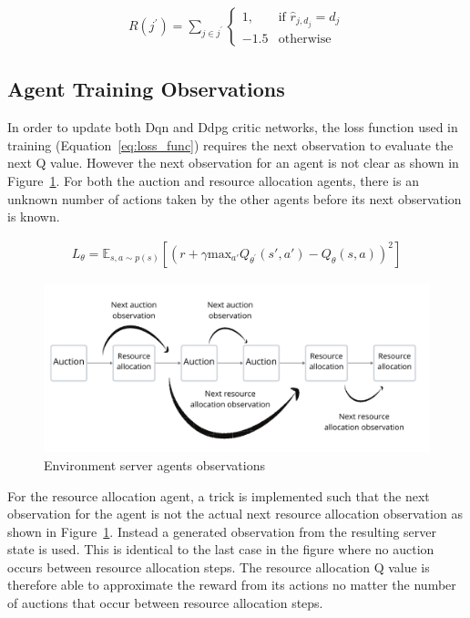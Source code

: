 \begin{align}
    R(j^{'}) = \sum_{j \in j^{'}}
        \begin{cases}
        1,  &\text{if } \hat{r}_{j, d_j} = d_j \\
       -1.5 &\text{otherwise }
        \end{cases}
\end{align}

\subsection{Agent Training Observations}
\label{subsec:agent-training-observations}
In order to update both Dqn and Ddpg critic networks, the loss function used in training (Equation~\eqref{eq:loss_func})
requires the next observation to evaluate the next Q value. However the next observation for an
agent is not clear as shown in Figure~\ref{fig:environment-observations}. For both the auction and resource allocation
agents, there is an unknown number of actions taken by the other agents before its next observation is known.

\begin{align}
    L_{\theta} = \mathbb{E}_{s, a \sim p(s)} \left[ (r + \gamma \text{max}_{a'} Q_{\theta^{'}}(s', a') - Q_{\theta}(s, a))^2 \right] \label{eq:loss_func}
\end{align}

\begin{figure}[h]
    \centering
    \includegraphics[width=14cm]{figures/4_implementation_figs/env_server_agents_observations.pdf}
    \caption{Environment server agents observations}
    \label{fig:environment-observations}
\end{figure}

For the resource allocation agent, a trick is implemented such that the next observation for the agent is not the
actual next resource allocation observation as shown in Figure~\ref{fig:environment-observations}. Instead a generated
observation from the resulting server state is used. This is identical to the last case in the figure
where no auction occurs between resource allocation steps. The resource allocation Q value is therefore able to
approximate the reward from its actions no matter the number of auctions that occur between
resource allocation steps.

